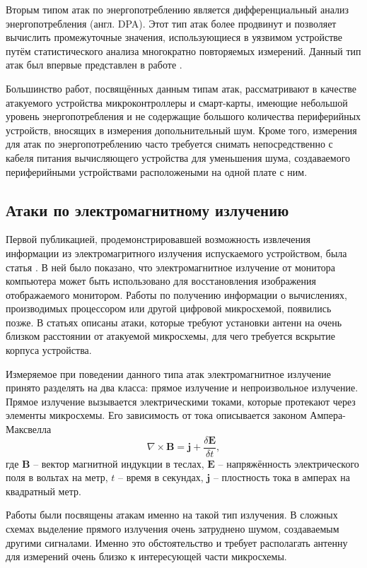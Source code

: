 Вторым типом атак по энергопотреблению является дифференциальный анализ
энергопотребления (англ. DPA). Этот тип атак более продвинут и позволяет
вычислить промежуточные значения, использующиеся в уязвимом устройстве путём
статистического анализа многократно повторяемых измерений. Данный тип атак был
впервые представлен в работе \cite{kocher-dpa}.

Большинство работ, посвящённых данным типам атак, рассматривают в качестве
атакуемого устройства микроконтроллеры и смарт-карты, имеющие небольшой уровень
энергопотребления и не содержащие большого количества периферийных устройств,
вносящих в измерения допольнительный шум. Кроме того, измерения для атак по
энергопотреблению часто требуется снимать непосредственно с кабеля питания
вычисляющего устройства для уменьшения шума, создаваемого периферийными
устройствами расположеными на одной плате с ним.

\subsection{Атаки по электромагнитному излучению}

Первой публикацией, продемонстрировавшей возможность извлечения информации
из электромагритного излучения испускаемого устройством, была статья
\cite{van-eck}. В ней было показано, что электромагнитное излучение от монитора
компьютера может быть использовано для восстановления изображения отображаемого
монитором. Работы по получению информации о вычислениях, производимых
процессором или другой цифровой микросхемой, появились позже. В статьях
\cite{ema1} \cite{ema2} описаны атаки, которые требуют установки антенн на очень
близком расстоянии от атакуемой микросхемы, для чего требуется вскрытие корпуса
устройства.

Измеряемое при поведении данного типа атак электромагнитное излучение принято
разделять на два класса: прямое излучение и непроизвольное излучение. Прямое
излучение вызывается электрическими токами, которые протекают через элементы
микросхемы. Его зависимость от тока описывается законом Ампера-Максвелла
\[
\nabla \times \mathbf{B} = \mathbf{j} + \frac{\delta \mathbf{E}}{\delta t},
\]
где $\mathbf{B}$ -- вектор магнитной индукции в теслах, $\mathbf{E}$ --
напряжённость электрического поля в вольтах на метр, $t$ -- время в секундах,
$\mathbf{j}$ -- плостность тока в амперах на квадратный метр.

Работы \cite{ema1} \cite{ema2} были посвящены атакам именно на такой тип
излучения. В сложных схемах выделение прямого излучения очень затруднено шумом,
создаваемым другими сигналами. Именно это обстоятельство и требует располагать
антенну для измерений очень близко к интересующей части микросхемы.

